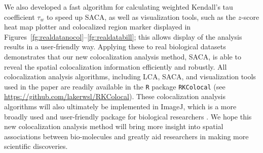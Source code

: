 \documentclass[10pt,twocolumn,twoside]{IEEEtran}
\begin{document}
We also developed a fast algorithm for calculating weighted Kendall's tau coefficient $\tau_w$ to speed up SACA, as well as visualization tools, such as the $z$-score heat map plotter and colocalized region marker displayed in Figures~\ref{fg:realdatanocol}--\ref{fg:realdatabill}; this allows display of the analysis results in a user-friendly way. Applying these to real biological datasets demonstrates that our new colocalization analysis method, SACA, is able to reveal the spatial colocalization information efficiently and robustly. All colocalization analysis algorithms, including LCA, SACA, and visualization tools used in the paper are readily available in the \texttt{R} package \texttt{RKColocal} (see \url{https://github.com/lakerwsl/RKColocal}). These colocalization analysis algorithms will also ultimately be implemented in ImageJ, which is a more broadly used and user-friendly package for biological researchers \citep[see][]{arena2016quantitating}. We hope this new colocalization analysis method will bring more insight into spatial associations between bio-molecules and greatly aid researchers in making more scientific discoveries.
















\ifCLASSOPTIONcaptionsoff
  \newpage
\fi





%
%
%
%
%
\end{document}
